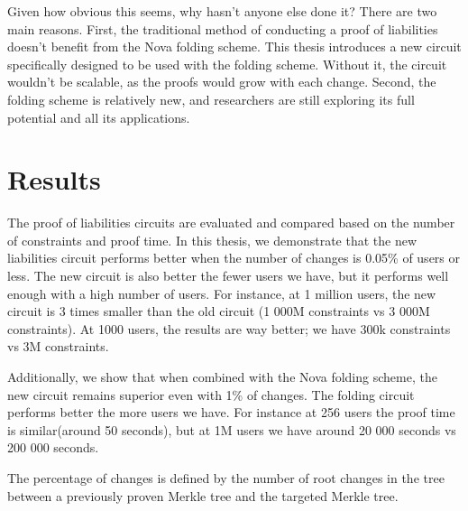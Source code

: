 Given how obvious this seems, why hasn't anyone else done it? 
There are two main reasons. First, the traditional method of conducting a proof of liabilities doesn't benefit from the 
Nova folding scheme. This thesis introduces a new circuit specifically designed to be used with the folding scheme. 
Without it, the circuit wouldn't be scalable, as the proofs would grow with each change. 
Second, the folding scheme is relatively new, and researchers are still exploring its full potential and all its applications.


\section{Results}
The proof of liabilities circuits are evaluated and compared based on the number of constraints and proof time. 
In this thesis, we demonstrate that the new liabilities circuit performs better when the number of changes is 0.05\% of users or less.
The new circuit is also better the fewer users we have, but it performs well enough with a high number of users. For instance, at 1 million users, 
the new circuit is 3 times smaller than the old circuit (1 000M constraints vs 3 000M constraints).
At 1000 users, the results are way better; we have 300k constraints vs 3M constraints. 

Additionally, we show that when combined with the Nova folding scheme, the new circuit remains superior even with 1\% of changes. 
The folding circuit performs better the more users we have.
For instance at 256 users the proof time is similar(around 50 seconds), but at 1M users we have around 20 000 seconds vs 200 000 seconds. 

The percentage of changes is defined by the number of root changes in the tree between a previously proven Merkle tree and the targeted Merkle tree.
